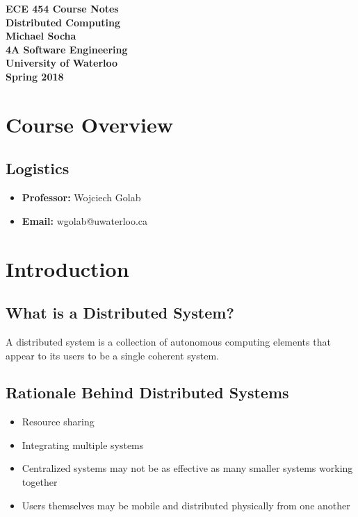 \documentclass[12pt,titlepage]{article}
\begin{document}
  \begin{titlepage}
    \vspace*{\fill}
    \centering

    \textbf{\Huge ECE 454 Course Notes} \\ [0.4em]
    \textbf{\Large Distributed Computing} \\ [1em]
    \textbf{\Large Michael Socha} \\ [1em]
    \textbf{\large 4A Software Engineering} \\
    \textbf{\large University of Waterloo} \\
    \textbf{\large Spring 2018} \\
    \vspace*{\fill}
  \end{titlepage}

  \newpage 

  \tableofcontents

  \newpage

  \section{Course Overview}
    \subsection{Logistics}
      \begin{itemize}
        \item \textbf{Professor:} Wojciech Golab
        \item \textbf{Email:} wgolab@uwaterloo.ca
      \end{itemize}

  \section{Introduction}
    \subsection{What is a Distributed System?}
      A distributed system is a collection of autonomous computing elements that appear to its users to be a single coherent system.

    \subsection{Rationale Behind Distributed Systems}
      \begin{itemize}
        \item Resource sharing
        \item Integrating multiple systems
        \item Centralized systems may not be as effective as many smaller systems working together
        \item Users themselves may be mobile and distributed physically from one another
      \end{itemize}
\end{document}
